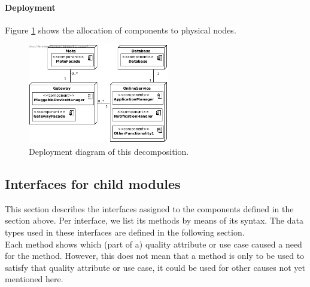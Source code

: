 
    \paragraph{Deployment}
        Figure \ref{fig:it1-depl_main} shows the allocation of components
        to physical nodes.

        \begin{figure}[!htp]
        	\centering
        	\includegraphics[width=0.55\textwidth]{images/deployment-diagram-1}
        	\caption{Deployment diagram of this decomposition.}\label{fig:it1-depl_main}
        \end{figure}


\subsection{Interfaces for child modules}\label{add1-interfaces}
    This section describes the interfaces assigned to the components defined
    in the section above. Per interface, we list its methods by means of its
    syntax. The data types used in these interfaces are defined in the following section. \\

    \noindent Each method shows which (part of a) quality attribute or use case caused
    a need for the method. However, this does not mean that a method is
    only to be used to satisfy that quality attribute or use case, it could
    be used for other causes not yet mentioned here.


